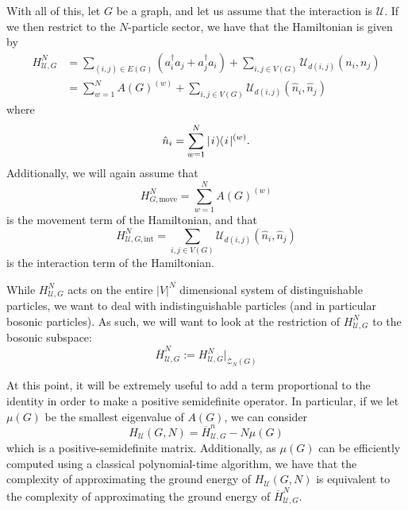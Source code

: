 \documentclass[../thesis-main/thesis-main]{subfiles}
\begin{document}
With all of this, let $G$ be a graph, and let us assume that the interaction is $\mathcal{U}$.  If we then restrict to the $N$-particle sector, we have that the Hamiltonian is given by
\begin{align}
  H_{\mathcal{U},G}^N &= \sum_{(i,j) \in E(G)} (a_i^\dag a_j + a_j^\dag a_i) + \sum_{i,j\in V(G)} \mathcal{U}_{d(i,j)}(n_i,n_j)\\
    &= \sum_{w=1}^N A(G)^{(w)} + \sum_{i,j\in V(G)} \mathcal{U}_{d(i,j)} (\hat{n}_i,\hat{n}_j)\label{eq:MPQW_Hamiltonian}
\end{align}
where
\begin{equation}
  \hat{n}_i = \sum_{w=1}^N |\mspace{2mu} i \mspace{2mu} \rangle\mspace{-2mu}\langle\mspace{2mu} i \mspace{2mu} |^{(w)}.
\end{equation}
Additionally, we will again assume that 
\begin{equation}
  H_{G,\text{move}}^N = \sum_{w=1}^N A(G)^{(w)}
  \label{eq:MPQW_Hamiltonian_move}
\end{equation}
is the movement term of the Hamiltonian, and that
\begin{equation}
  H_{\mathcal{U},G,\text{int}}^{N} =  \sum_{i,j\in V(G)} \mathcal{U}_{d(i,j)} (\hat{n}_i,\hat{n}_j)
  \label{eq:MPQW_Hamiltonian_int}
\end{equation}
is the interaction term of the Hamiltonian.


While $H_{\mathcal{U},G}^N$ acts on the entire $|V|^N$ dimensional system of distinguishable particles, we want to deal with indistinguishable particles (and in particular bosonic particles).  As such, we will want to look at the restriction of $H_{\mathcal{U},G}^N$ to the bosonic subspace:
\begin{equation}
  \overline{H}_{\mathcal{U},G}^N := H_{\mathcal{U},G}^N \big|_{\mathcal{Z}_N(G)}
\end{equation}


At this point, it will be extremely useful to add a term proportional to the identity in order to make a positive semidefinite operator. In particular, if we let $\mu(G)$ be the smallest eigenvalue of $A(G)$, we can consider 
\begin{equation}
  H_{\mathcal{U}}(G,N) = \overline{H}_{\mathcal{U},G}^n - N \mu(G)
\end{equation}
which is a positive-semidefinite matrix.  Additionally, as $\mu(G)$ can be efficiently computed using a classical polynomial-time algorithm, we have that the complexity of approximating the ground energy of $H_{\mathcal{U}}(G,N)$ is equivalent to the complexity of approximating the ground energy of $\overline{H}_{\mathcal{U},G}^N$.  
\end{document}
